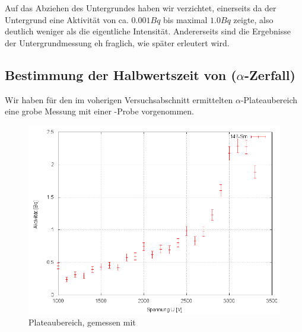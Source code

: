 Auf das Abziehen des Untergrundes haben wir verzichtet, einerseits da der Untergrund eine Aktivität von ca. $0.001Bq$ bis maximal $1.0Bq$ zeigte, also deutlich weniger als die eigentliche Intensität. Andererseits sind die Ergebnisse der Untergrundmessung eh fraglich, wie später erleutert wird.

\subsection{Bestimmung der Halbwertszeit von  ($\alpha$-Zerfall)}

Wir haben für den im voherigen Versuchsabschnitt ermittelten $\alpha$-Plateaubereich eine grobe Messung mit einer -Probe vorgenommen. 

\begin{figure}[H]
 \centering \includegraphics[width=0.9\linewidth]{Messwerte/plots/Sm147_plateau.png}
 \caption{Plateaubereich, gemessen mit }
\end{figure}